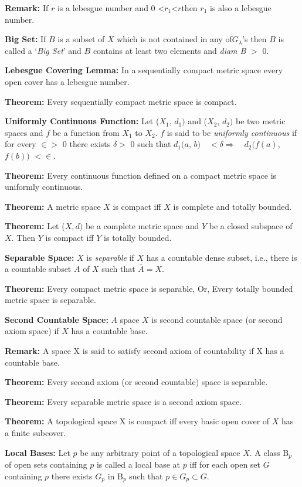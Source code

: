\documentclass[12pt]{amsart}
\begin{document}
\textbf{Remark:} If $r$ is a lebesgue number and 0 <$ r_{1} $<$ r $then $r_{1}$ is also a 
lebesgue number.

\textbf{Big Set:} If $B$ is a subset of $X$ which is not contained in any 
of$G_\lambda $'s then $B$ is called a `\textit{Big Set}' and $B$ contains at least two elements 
and \textit{diam B} $>$ 0.

\textbf{Lebesgue Covering Lemma:} In a sequentially compact metric space 
every open cover has a lebesgue number.

\textbf{Theorem:} Every sequentially compact metric space is compact.

\textbf{Uniformly Continuous Function:} Let ($X_{1}$, $d_{1})$ and ($X_{2}$, 
$d_{2})$ be two metric spaces and $f$ be a function from $X_{1}$ to $X_{2}$. $f$ is 
said to be \textit{uniformly continuous }if for every $\in >$ 0 there exists $\delta >$ 0 such that 
$d_{1}(a$, $b) \quad <\delta \Rightarrow  \quad d_{2}(f(a)$, $f(b))$ $<\in $.

\textbf{Theorem:} Every continuous function defined on a compact metric 
space is uniformly continuous. 

\textbf{Theorem:} A metric space $X$ is compact iff $X$ is complete and totally 
bounded.

\textbf{Theorem:} Let ($X, d )$ be a complete metric space and $Y$ be a closed 
subspace of $X$. Then $Y$ is compact iff $Y$ is totally bounded.

\textbf{Separable Space:} $X$ is \textit{separable} if $X$ has a countable dense subset, i.e., there 
is a countable subset $A$ of $X$ such that $\overline A =X$.

\textbf{Theorem:} Every compact metric space is separable, Or, Every totally 
bounded metric space is separable.

\textbf{Second Countable Space:} $A$ space $X$ is second countable space (or 
second axiom space) if $X$ has a countable base.

\textbf{Remark:} A space X is said to satisfy second axiom of countability 
if X has a countable base.

\textbf{Theorem:} Every second axiom (or second countable) space is 
separable.

\textbf{Theorem:} Every separable metric space is a second axiom space.

\textbf{Theorem:} A topological space X is compact iff every basic open 
cover of $X$ has a finite subcover.

\textbf{Local Bases:} Let $p$ be any arbitrary point of a topological space 
$X$. A class B$_{p}$ of open sets containing $p$ is called a local base at $p$ iff 
for each open set $G$ containing $p$ there exists $G_{p}$ in B$_{p}$ such that 
$p\in G_{p}\subset G$.
\end{document}
